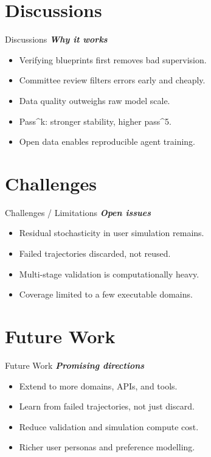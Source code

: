 \documentclass{beamer}
\begin{document}
\section{Discussions}
\begin{frame}{Discussions}
\textbf{\textit{Why it works}}
\begin{itemize}
\item Verifying blueprints first removes bad supervision.
\item Committee review filters errors early and cheaply.
\item Data quality outweighs raw model scale.
\item Pass\textasciicircum{}k: stronger stability, higher pass\textasciicircum{}5.
\item Open data enables reproducible agent training.
\end{itemize}
\end{frame}

\section{Challenges}
\begin{frame}{Challenges / Limitations}
\textbf{\textit{Open issues}}
\begin{itemize}
\item Residual stochasticity in user simulation remains.
\item Failed trajectories discarded, not reused.
\item Multi-stage validation is computationally heavy.
\item Coverage limited to a few executable domains.
\end{itemize}
\end{frame}

\section{Future Work}
\begin{frame}{Future Work}
\textbf{\textit{Promising directions}}
\begin{itemize}
\item Extend to more domains, APIs, and tools.
\item Learn from failed trajectories, not just discard.
\item Reduce validation and simulation compute cost.
\item Richer user personas and preference modelling.
\end{itemize}
\end{frame}
\end{document}
